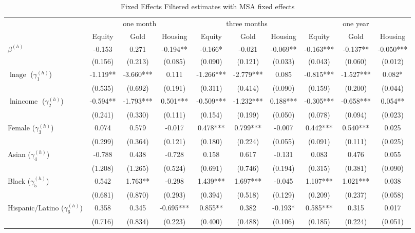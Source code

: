 \begin{table}[!h]\caption{Fixed Effects Filtered estimates with MSA fixed effects}\centering 
\begin{threeparttable} 
\begin{tabular}{|l|ccc|ccc|ccc|}\toprule 
& \multicolumn{3}{c}{one month} & \multicolumn{3}{c}{three months}&\multicolumn{3}{c}{one year}   \\  
 & Equity & Gold & Housing & Equity  & Gold & Housing & Equity & Gold & Housing \\\midrule 
$\beta^{(h)}$ & -0.153 & 0.271 & -0.194** & -0.166* & -0.021 & -0.069** & -0.163*** & -0.137** & -0.050*** \\ 
 & (0.156) & (0.213) & (0.085)& (0.090) & (0.121) & (0.033)& (0.043) & (0.060) & (0.012) \\ 
$\ln \text{age}$ ($\gamma^{(h)}_1$) & -1.119** & -3.660*** & 0.111 & -1.266*** & -2.779*** & 0.085 & -0.815*** & -1.527*** & 0.082* \\ 
 & (0.535) & (0.692) & (0.191)& (0.311) & (0.414) & (0.090)& (0.159) & (0.200) & (0.044) \\ 
$\ln \text{income}$ ($\gamma^{(h)}_2$) & -0.594** & -1.793*** & 0.501*** & -0.509*** & -1.232*** & 0.188*** & -0.305*** & -0.658*** & 0.054** \\ 
 & (0.241) & (0.330) & (0.111)& (0.154) & (0.199) & (0.050)& (0.078) & (0.094) & (0.023) \\ 
Female ($\gamma^{(h)}_3$) & 0.074 & 0.579 & -0.017 & 0.478*** & 0.799*** & -0.007 & 0.442*** & 0.540*** & 0.025 \\ 
 & (0.299) & (0.364) & (0.121)& (0.180) & (0.224) & (0.055)& (0.091) & (0.111) & (0.025) \\ 
Asian ($\gamma^{(h)}_4$) & -0.788 & 0.438 & -0.728 & 0.158 & 0.617 & -0.131 & 0.083 & 0.476 & 0.055 \\ 
 & (1.208) & (1.265) & (0.524)& (0.691) & (0.746) & (0.194)& (0.315) & (0.381) & (0.090) \\ 
Black ($\gamma^{(h)}_5$) & 0.542 & 1.763** & -0.298 & 1.439*** & 1.697*** & -0.045 & 1.107*** & 1.021*** & 0.038 \\ 
 & (0.681) & (0.870) & (0.293)& (0.394) & (0.518) & (0.129)& (0.209) & (0.237) & (0.058) \\ 
Hispanic/Latino ($\gamma^{(h)}_6$) & 0.358 & 0.345 & -0.695*** & 0.855** & 0.382 & -0.193* & 0.585*** & 0.315 & 0.017 \\ 
 & (0.716) & (0.834) & (0.223)& (0.400) & (0.488) & (0.106)& (0.185) & (0.224) & (0.051) \\ 

\end{tabular}
\end{threeparttable}
\end{table}
